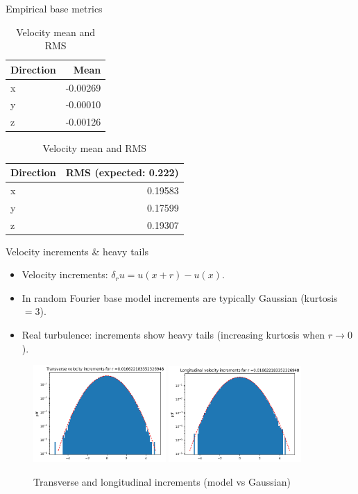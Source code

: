 \documentclass[11pt]{beamer}
\begin{document}
\begin{frame}{Empirical base metrics}
  \begin{table}
    \centering
    \begin{tabular}{lr}
      \toprule
      \textbf{Direction} & \textbf{Mean} \\
      \midrule
      x & -0.00269 \\
      y & -0.00010 \\
      z & -0.00126 \\
      \bottomrule
    \end{tabular}
    \qquad
    \begin{tabular}{lr}
      \toprule
      \textbf{Direction} & \textbf{RMS (expected: 0.222)} \\
      \midrule
      x & 0.19583 \\
      y & 0.17599 \\
      z & 0.19307 \\
      \bottomrule
    \end{tabular}
    \caption{Velocity mean and RMS}
  \end{table}
\end{frame}

\begin{frame}{Velocity increments \& heavy tails}
  \begin{itemize}
    \item Velocity increments: $\delta_r u = u(x+r)-u(x)$.
    \item In random Fourier base model increments are typically Gaussian (kurtosis $=3$).
    \item Real turbulence: increments show heavy tails (increasing kurtosis when $r\to 0$).
  \end{itemize}
  \begin{figure}
    \centering
    \includegraphics[width=0.45\textwidth]{illustrations/TransVelIncrExample.png}
    \includegraphics[width=0.45\textwidth]{illustrations/LongVelIncrExample.png}
    \caption{Transverse and longitudinal increments (model vs Gaussian)}
  \end{figure}
\end{frame}
\end{document}
